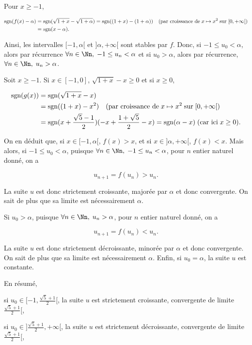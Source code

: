 {{Pour $x\geq-1$,

\begin{align*}\ensuremath
\mbox{sgn}(f(x)-\alpha)&=\mbox{sgn}(\sqrt{1+x}-\sqrt{1+\alpha})=\mbox{sgn}((1+x)-(1+\alpha))\quad(\mbox{par croissance de}\;x\mapsto x^2\;\mbox{sur}\;[0,+\infty[)\\
 &=\mbox{sgn}(x-\alpha).
\end{align*}

Ainsi, les intervalles $[-1,\alpha[$ et $]\alpha,+\infty[$ sont stables par $f$. Donc, si $-1\leq u_0<\alpha$, alors par récurrence $\forall n\in\Nn,\;-1\leq u_n<\alpha$ et si $u_0>\alpha$, alors par récurrence, $\forall n\in\Nn,\;u_n>\alpha$.

Soit $x\geq-1$. Si $x\in[-1,0]$, $\sqrt{1+x}-x\geq0$ et si $x\geq0$,

\begin{align*}\ensuremath
\mbox{sgn}(g(x))&=\mbox{sgn}(\sqrt{1+x}-x)\\
 &=\mbox{sgn}((1+x)-x^2)\quad(\mbox{par croissance de}\;x\mapsto x^2\;\mbox{sur}\;[0,+\infty[)\\
 &=\mbox{sgn}(x+\frac{\sqrt{5}-1}{2})(-x+\frac{1+\sqrt{5}}{2}-x)=\mbox{sgn}(\alpha-x)\;(\mbox{car ici}\;x\geq0).
\end{align*}

On en déduit que, si $x\in[-1,\alpha[$, $f(x)>x$, et si $x\in]\alpha,+\infty[$, $f(x)<x$. Mais alors, 
si $-1\leq u_0<\alpha$, puisque $\forall n\in\Nn,\;-1\leq u_n<\alpha$, pour $n$ entier naturel donné, on a

$$u_{n+1}=f(u_n)>u_n.$$

La suite $u$ est donc strictement croissante, majorée par $\alpha$ et donc convergente. On sait de plus que sa limite est nécessairement $\alpha$.

Si $u_0>\alpha$, puisque $\forall n\in\Nn,\;u_n>\alpha$, pour $n$ entier naturel donné, on a

$$u_{n+1}=f(u_n)<u_n.$$

La suite $u$ est donc strictement décroissante, minorée par $\alpha$ et donc convergente. On sait de plus que sa limite est nécessairement $\alpha$. Enfin, si $u_0=\alpha$, la suite $u$ est constante.

En résumé,

si $u_0\in[-1,\frac{\sqrt{5}+1}{2}[$, la suite $u$ est strictement croissante, convergente de limite $\frac{\sqrt{5}+1}{2}[$,

si $u_0\in]\frac{\sqrt{5}+1}{2},+\infty[$, la suite $u$ est strictement décroissante, convergente de limite $\frac{\sqrt{5}+1}{2}[$,

}}
